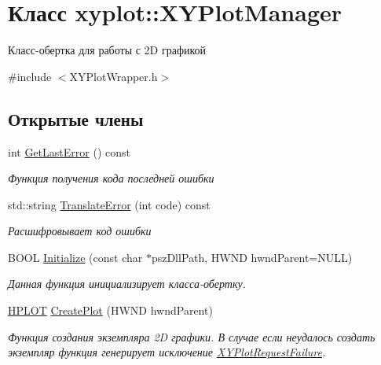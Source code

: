 \hypertarget{classxyplot_1_1_x_y_plot_manager}{\section{Класс xyplot\-:\-:X\-Y\-Plot\-Manager}
\label{classxyplot_1_1_x_y_plot_manager}
}


Класс-\/обертка для работы с 2\-D графикой  




{\ttfamily \#include $<$X\-Y\-Plot\-Wrapper.\-h$>$}

\subsection*{Открытые члены}
\begin{DoxyCompactItemize}
\item 
int \hyperlink{classxyplot_1_1_x_y_plot_manager_ad9528d6181d8935cc7ad9c1d34671bc8}{Get\-Last\-Error} () const 
\begin{DoxyCompactList}\small\item\em Функция получения кода последней ошибки \end{DoxyCompactList}\item 
std\-::string \hyperlink{classxyplot_1_1_x_y_plot_manager_a756b2e15fad862294eabbf6781ff8034}{Translate\-Error} (int code) const 
\begin{DoxyCompactList}\small\item\em Расшифровывает код ошибки \end{DoxyCompactList}\item 
B\-O\-O\-L \hyperlink{group__group1_ga894a76ee9162ccae431581ed25c5029f}{Initialize} (const char $\ast$psz\-Dll\-Path, H\-W\-N\-D hwnd\-Parent=N\-U\-L\-L)
\begin{DoxyCompactList}\small\item\em Данная функция инициализирует класса-\/обертку. \end{DoxyCompactList}\item 
\hyperlink{classxyplot_1_1_h_p_l_o_t}{H\-P\-L\-O\-T} \hyperlink{group__group1_ga056dc5f3c798c3c3f38d2ac9d4051ecb}{Create\-Plot} (H\-W\-N\-D hwnd\-Parent)
\begin{DoxyCompactList}\small\item\em Функция создания экземпляра 2\-D графики. В случае если неудалось создать экземпляр функция генерирует исключение \hyperlink{classxyplot_1_1_x_y_plot_request_failure}{X\-Y\-Plot\-Request\-Failure}. \end{DoxyCompactList}\item 

\end{DoxyCompactItemize}

